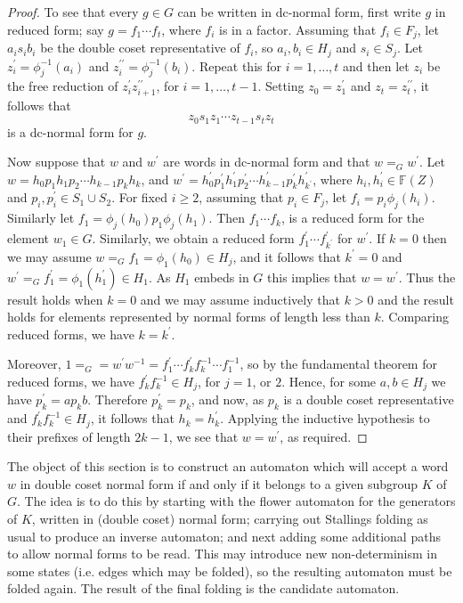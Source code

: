 \documentclass[a4paper,12pt]{article}
\numberwithin{equation}{section}
\numberwithin{figure}{section}
\newcommand{\FF}{\ensuremath{\mathbb{F}}}
\begin{document}
\begin{proof}
To see that every $g\in G$ can be written in dc-normal form, first
write $g$ in reduced form; say $g=f_1\cdots f_t$, where $f_i$ is in a
factor. Assuming that $f_i\in F_j$, let $a_is_ib_i$ 
be the double coset representative of $f_i$, so
$a_i,b_i\in H_j$ and $s_i\in S_j$. Let $z^{\prime}_i=\phi_j^{-1}(a_i)$ and 
$z^{\prime\prime}_i=\phi_j^{-1}(b_i)$. Repeat this for $i=1,\ldots ,t$ and then
let $z_i$ be the free reduction of $z^{\prime}_iz^{\prime\prime}_{i+1}$, 
for $i=1,\ldots ,t-1$. Setting $z_0=z^{\prime}_1$ and $z_t=
z^{\prime\prime}_t$, it follows that 
\[z_0s_1z_1\cdots z_{t-1}s_tz_t\]
is a dc-normal form for $g$. 

Now suppose that $w$ and $w^\prime$ are words in dc-normal form and that 
$w=_G w^\prime$. Let $w=h_{0}p_1h_{1}p_2 \cdots h_{k-1}p_kh_{{k}}$,
and $w^\prime =h_{0}^\prime p_1^\prime h_{1}^\prime  p_2^\prime 
\cdots h_{k-1}^\prime p_k^\prime h_{{k^\prime}}^\prime$, where 
$h_i, h_i^\prime\in \FF(Z)$ and $p_i,p_i^\prime\in S_1\cup S_2$.
 For fixed $i\ge 2$, assuming that $p_i\in F_j$, let $f_i=p_i\phi_j(h_i)$. 
Similarly let $f_1=\phi_j(h_0)p_1\phi_j(h_1)$. Then $f_1\cdots f_k$, is 
a reduced form for the element $w_1\in G$. Similarly, we obtain a reduced
form $f_1^\prime \cdots f_{k^\prime}^\prime$ for $w^\prime$. 
If $k=0$ then we may assume $w=_G f_1=\phi_1(h_0)\in H_j$, 
and it follows that $k^\prime =0$ and $w^\prime=_G f_1^\prime=\phi_1(h_1^\prime)\in H_1$. 
As $H_1$ embeds in $G$ this implies that $w=w^\prime$. Thus the result
holds when $k=0$ and we may assume inductively that $k>0$ and the result holds 
for elements represented by normal forms of length less than $k$. 
Comparing reduced forms, we have $k=k^\prime$. 

Moreover, $1=_G =w^\prime w^{-1}= f_1^\prime \cdots f_{k}^\prime
f_k^{-1}\cdots f_1^{-1}$, so by the fundamental theorem for reduced forms,
we have $ f_{k}^\prime f_k^{-1}\in H_j$, for $j=1$, or $2$. Hence, for 
some $a, b\in H_j$ we have $p_k^\prime=a p_k b$. Therefore $p_k^\prime =p_k$,
and now, as $p_k$ is a double coset representative and  $ f_{k}^\prime f_k^{-1}\in H_j$,
it follows that $h_k=h_k^\prime$. Applying the inductive hypothesis to their prefixes of 
length
$2k-1$, we see that $w=w^\prime$, as required.
\end{proof}
The object of this section is to construct an automaton which will accept a word
$w$ in double coset normal form if and only if it belongs to a
given subgroup $K$ of $G$. The idea is to do this by starting with the
flower automaton for the generators of $K$, written in (double
coset) normal form; carrying out Stallings folding as usual to
produce an inverse automaton; and next
adding some additional paths to allow normal forms to be read.
This may introduce new non-determinism in some  states (i.e. edges
which may be folded), so the resulting automaton must be folded
again. The result of the final folding is the candidate automaton.
\end{document}
